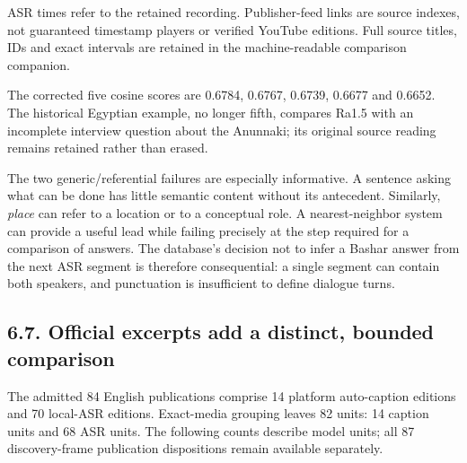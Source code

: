 \documentclass[
  11pt,
]{article}
\begin{document}
ASR times refer to the retained recording. Publisher-feed links are
source indexes, not guaranteed timestamp players or verified YouTube
editions. Full source titles, IDs and exact intervals are retained in
the machine-readable comparison companion.

The corrected five cosine scores are 0.6784, 0.6767, 0.6739, 0.6677 and
0.6652. The historical Egyptian example, no longer fifth, compares Ra1.5
with an incomplete interview question about the Anunnaki; its original
source reading remains retained rather than erased.

The two generic/referential failures are especially informative. A
sentence asking what can be done has little semantic content without its
antecedent. Similarly, \emph{place} can refer to a location or to a
conceptual role. A nearest-neighbor system can provide a useful lead
while failing precisely at the step required for a comparison of
answers. The database's decision not to infer a Bashar answer from the
next ASR segment is therefore consequential: a single segment can
contain both speakers, and punctuation is insufficient to define
dialogue turns.

\clearpage

\subsection{6.7. Official excerpts add a distinct, bounded
comparison}\label{official-excerpts-add-a-distinct-bounded-comparison}

The admitted 84 English publications comprise 14 platform auto-caption
editions and 70 local-ASR editions. Exact-media grouping leaves 82
units: 14 caption units and 68 ASR units. The following counts describe
model units; all 87 discovery-frame publication dispositions remain
available separately.
\end{document}
